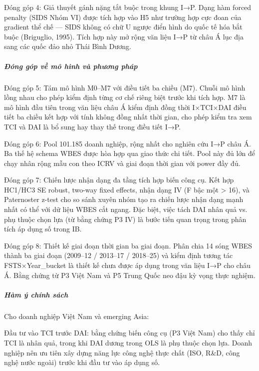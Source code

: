 \documentclass[12pt,a4paper]{article}
\begin{document}
Đóng góp 4: Giả thuyết gánh nặng tắt buộc trong khung I→P. Dạng hàm
forced penalty (SIDS Nhóm VI) được tích hợp vào H5 như trường hợp cực
đoan của gradient thể chế --- SIDS không có chữ U ngược điển hình do
quốc tế hóa bắt buộc (Briguglio, 1995). Tích hợp này mở rộng văn liệu
I→P từ châu Á lục địa sang các quốc đảo nhỏ Thái Bình Dương.

\hypertarget{ux111uxf3ng-guxf3p-vux1ec1-muxf4-huxecnh-vuxe0-phux1b0ux1a1ng-phuxe1p}{%
\subparagraph{Đóng góp về mô hình và phương
pháp}\label{ux111uxf3ng-guxf3p-vux1ec1-muxf4-huxecnh-vuxe0-phux1b0ux1a1ng-phuxe1p}}

Đóng góp 5: Tám mô hình M0--M7 với điều tiết ba chiều (M7). Chuỗi mô
hình lồng nhau cho phép kiểm định từng cơ chế riêng biệt trước khi tích
hợp. M7 là mô hình đầu tiên trong văn liệu châu Á kiểm định đồng thời
I×TCI×DAI điều tiết ba chiều kết hợp với tính không đồng nhất thời gian,
cho phép kiểm tra xem TCI và DAI là bổ sung hay thay thế trong điều tiết
I→P.

Đóng góp 6: Pool 101.185 doanh nghiệp, rộng nhất cho nghiên cứu I→P châu
Á. Ba thế hệ schema WBES được hòa hợp qua giao thức chi tiết. Pool này
đủ lớn để chạy nhân rộng mẫu con theo ICRV và giai đoạn thời gian với
power đầy đủ.

Đóng góp 7: Chiến lược nhận dạng đa tầng tích hợp biến công cụ. Kết hợp
HC1/HC3 SE robust, two-way fixed effects, nhận dạng IV (F bậc một
\textgreater{} 16), và Paternoster z-test cho so sánh xuyên nhóm tạo ra
chiến lược nhận dạng mạnh nhất có thể với dữ liệu WBES cắt ngang. Đặc
biệt, việc tách DAI nhân quả vs. phụ thuộc chọn lựa (từ bằng chứng P3
IV) là bước tiến quan trọng trong phân tích áp dụng số trong IB.

Đóng góp 8: Thiết kế giai đoạn thời gian ba giai đoạn. Phân chia 14 sóng
WBES thành ba giai đoạn (2009--12 / 2013--17 / 2018--25) và kiểm định
tương tác FSTS×Year\_bucket là thiết kế chưa được áp dụng trong văn liệu
I→P cho châu Á. Bằng chứng từ P3 Việt Nam và P5 Trung Quốc neo đậu kỳ
vọng thực nghiệm.

\hypertarget{huxe0m-uxfd-chuxednh-suxe1ch}{%
\subparagraph{Hàm ý chính sách}\label{huxe0m-uxfd-chuxednh-suxe1ch}}

Cho doanh nghiệp Việt Nam và emerging Asia:

Đầu tư vào TCI trước DAI: bằng chứng biến công cụ (P3 Việt Nam) cho thấy
chỉ TCI là nhân quả, trong khi DAI dương trong OLS là phụ thuộc chọn
lựa. Doanh nghiệp nên ưu tiên xây dựng năng lực công nghệ thực chất
(ISO, R\&D, công nghệ nước ngoài) trước khi đầu tư vào áp dụng số.
\end{document}
